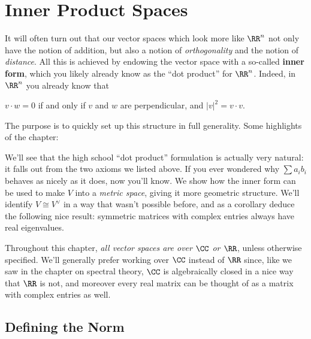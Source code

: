 \chapter{Inner Product Spaces}
It will often turn out that our vector spaces which look more like $\RR^n$
not only have the notion of addition, but also a notion of \emph{orthogonality}
and the notion of \emph{distance}.
All this is achieved by endowing the vector space with a so-called \textbf{inner form},
which you likely already know as the ``dot product'' for $\RR^n$.
Indeed, in $\RR^n$ you already know that
\begin{itemize}
	\ii $v \cdot w = 0$ if and only if $v$ and $w$ are perpendicular, and
	\ii $|v|^2 = v \cdot v$.
\end{itemize}
The purpose is to quickly set up this structure in full generality.
Some highlights of the chapter:
\begin{itemize}
	\ii We'll see that the high school ``dot product'' formulation is actually very natural:
	it falls out from the two axioms we listed above.
	If you ever wondered why $\sum a_ib_i$ behaves as nicely as it does, now you'll know.
	\ii We show how the inner form can be used to make $V$ into a \emph{metric space},
	giving it more geometric structure.
	\ii We'll identify $V \cong V^\vee$ in a way that wasn't possible before,
	and as a corollary deduce the following nice result:
	symmetric matrices with complex entries always have real eigenvalues.
\end{itemize}

Throughout this chapter, \emph{all vector spaces are over $\CC$ or $\RR$},
unless otherwise specified.
We'll generally prefer working over $\CC$ instead of $\RR$ since,
like we saw in the chapter on spectral theory, $\CC$ is algebraically closed
in a nice way that $\RR$ is not,
and moreover every real matrix can be thought of as a matrix with complex entries as well.

\section{Defining the Norm}

